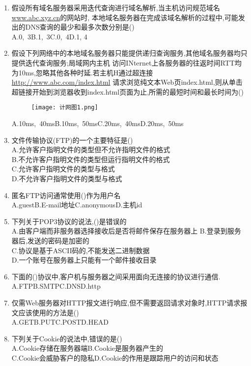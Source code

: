 \documentclass[12pt, a4paper, oneside, UTF8]{ctexbook}
\begin{document}
\begin{enumerate}
    \item 假设所有域名服务器采用迭代查询进行域名解析,当主机访问规范域名\underline{www.abc.xyz.cn}的网站时,
    本地域名服务器在完成该域名解析的过程中,可能发出的DNS查询的最少和最多次数分别是() \\
    A.0,\ 3\qquad B.1,\ 3\qquad C.0,\ 4\qquad D.1, 4

    \item 假设下列网络中的本地域名服务器只能提供递归查询服务,其他域名服务器均只提供迭代查询服务;局域网内主机
    访问INternet上各服务器的往返时间RTT均为10ms,忽略其他各种时延.若主机H通过超连接\underline{http://www.abc.com/index.html}
    请求浏览纯文本Web页index.html,则从单击超链接开始到浏览器收到index.html页面为止,所需的最短时间和最长时间为()  \\
    \begin{figure}[htbp]
        \centering
        \texttt{[image: 计网图1.png]}
    \end{figure}
    A.10ms,\ 40ms\qquad B.10ms,\ 50ms\qquad C.20ms,\ 40ms\qquad D.20ms,\ 50ms

    \item 文件传输协议(FTP)的一个主要特征是() \\
    A.允许客户指明文件的类型但不允许指明文件的格式 \\
    B.不允许客户指明文件的类型但运行指明文件的格式 \\
    C.允许客户指明文件的类型与格式 \\
    D.不允许客户指明文件的类型与格式 

    \item 匿名FTP访问通常使用()作为用户名 \\
    A.guest\qquad B.E-mail地址\qquad C.anonymous\qquad D.主机id

    \item 下列关于POP3协议的说法,()是错误的 \\
    A.由客户端而非服务器选择接收后是否将邮件保存在服务器上
    B.登录到服务器后,发送的密码是加密的 \\
    C.协议是基于ASCII码的,不能发送二进制数据 \\
    D.一个账号在服务器上只能有一个邮件接收目录 

    \item 下面的()协议中,客户机与服务器之间采用面向无连接的协议进行通信. \\
    A.FTP\qquad B.SMTP\qquad C.DNS\qquad D.http

    \item 仅需Web服务器对HTTP报文进行响应,但不需要返回请求对象时,HTTP请求报文应该使用的方法是() \\
    A.GET\qquad B.PUT\qquad C.POST\qquad D.HEAD

    \item 下列关于Cookie的说法中,错误的是() \\
    A.Cookie存储在服务器端\qquad B.Cookie是服务器产生的\\
    C.Cookie会威胁客户的隐私\qquad D.Cookie的作用是跟踪用户的访问和状态

\end{enumerate}
\end{document}
